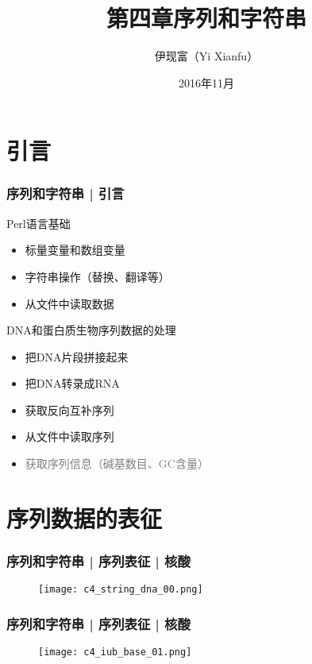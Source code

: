 


\title[序列和字符串]{第四章\quad 序列和字符串}
\author[Yixf]{伊现富（Yi Xianfu）}
\date{2016年11月}




\section{引言}
\begin{frame}
  \frametitle{序列和字符串 | 引言}
  \begin{block}{Perl语言基础}
    \begin{itemize}
      \item 标量变量和数组变量
      \item 字符串操作（替换、翻译等）
      \item 从文件中读取数据
    \end{itemize}
  \end{block}
  \pause
  \begin{block}{DNA和蛋白质生物序列数据的处理}
    \begin{itemize}
      \item 把DNA片段拼接起来
      \item 把DNA转录成RNA
      \item 获取反向互补序列
      \item 从文件中读取序列
      \item \textcolor{gray}{获取序列信息（碱基数目、GC含量）}
    \end{itemize}
  \end{block}
\end{frame}

\section{序列数据的表征}
\begin{frame}
  \frametitle{序列和字符串 | 序列表征 | 核酸}
  \begin{figure}
    \centering
    \texttt{[image: c4\_string\_dna\_00.png]}
  \end{figure}
\end{frame}

\begin{frame}
  \frametitle{序列和字符串 | 序列表征 | 核酸}
  \begin{figure}
    \centering
    \texttt{[image: c4\_iub\_base\_01.png]}
  \end{figure}
\end{frame}

